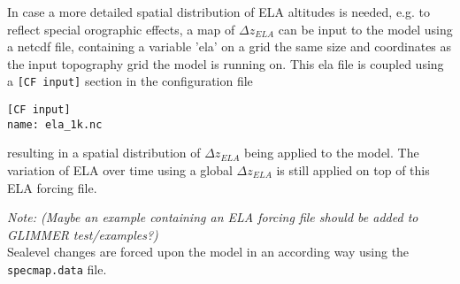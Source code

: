 In case a more detailed spatial distribution of ELA altitudes is needed, e.g. 
to reflect special orographic effects, a map of $\Delta z_{ELA}$ can be input
to the model using a netcdf file, containing a variable 'ela' on a grid
the same size and coordinates as the input topography grid the model is running
on. This ela file is coupled using a \texttt{[CF input]} section in the
configuration file
\begin{verbatim}
[CF input]
name: ela_1k.nc
\end{verbatim}
resulting in a spatial distribution of $\Delta z_{ELA}$ being applied to the
model. The variation of ELA over time using a global $\Delta z_{ELA}$ is still
applied on top of this ELA forcing file.

\textcolor[rgb]{1.00,0.00,0.00}{\emph{Note: (Maybe an example
containing an ELA forcing file should be added to GLIMMER test/examples?)}}
\\
Sealevel changes are forced upon the model in an according way using the
\texttt{specmap.data} file.
